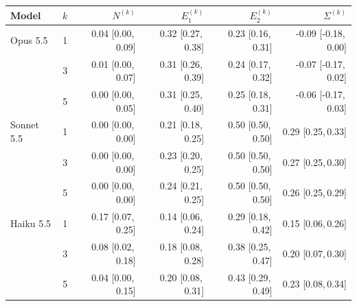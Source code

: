 \begin{tabular}{@{}lrrrrr@{}}
\toprule
Model & $k$ & $N^{(k)}$ & $E_1^{(k)}$ & $E_2^{(k)}$ & $\Sigma^{(k)}$ \\
\midrule
Opus 5.5 & 1 & 0.04 {\scriptsize[0.00,\,0.09]} & 0.32 {\scriptsize[0.27,\,0.38]} & 0.23 {\scriptsize[0.16,\,0.31]} & -0.09 {\scriptsize[-0.18,\,0.00]} \\
 & 3 & 0.01 {\scriptsize[0.00,\,0.07]} & 0.31 {\scriptsize[0.26,\,0.39]} & 0.24 {\scriptsize[0.17,\,0.32]} & -0.07 {\scriptsize[-0.17,\,0.02]} \\
 & 5 & 0.00 {\scriptsize[0.00,\,0.05]} & 0.31 {\scriptsize[0.25,\,0.40]} & 0.25 {\scriptsize[0.18,\,0.31]} & -0.06 {\scriptsize[-0.17,\,0.03]} \\
Sonnet 5.5 & 1 & 0.00 {\scriptsize[0.00,\,0.00]} & 0.21 {\scriptsize[0.18,\,0.25]} & 0.50 {\scriptsize[0.50,\,0.50]} & 0.29 {\scriptsize[0.25,\,0.33]} \\
 & 3 & 0.00 {\scriptsize[0.00,\,0.00]} & 0.23 {\scriptsize[0.20,\,0.25]} & 0.50 {\scriptsize[0.50,\,0.50]} & 0.27 {\scriptsize[0.25,\,0.30]} \\
 & 5 & 0.00 {\scriptsize[0.00,\,0.00]} & 0.24 {\scriptsize[0.21,\,0.25]} & 0.50 {\scriptsize[0.50,\,0.50]} & 0.26 {\scriptsize[0.25,\,0.29]} \\
Haiku 5.5 & 1 & 0.17 {\scriptsize[0.07,\,0.25]} & 0.14 {\scriptsize[0.06,\,0.24]} & 0.29 {\scriptsize[0.18,\,0.42]} & 0.15 {\scriptsize[0.06,\,0.26]} \\
 & 3 & 0.08 {\scriptsize[0.02,\,0.18]} & 0.18 {\scriptsize[0.08,\,0.28]} & 0.38 {\scriptsize[0.25,\,0.47]} & 0.20 {\scriptsize[0.07,\,0.30]} \\
 & 5 & 0.04 {\scriptsize[0.00,\,0.15]} & 0.20 {\scriptsize[0.08,\,0.31]} & 0.43 {\scriptsize[0.29,\,0.49]} & 0.23 {\scriptsize[0.08,\,0.34]} \\
\bottomrule
\end{tabular}
